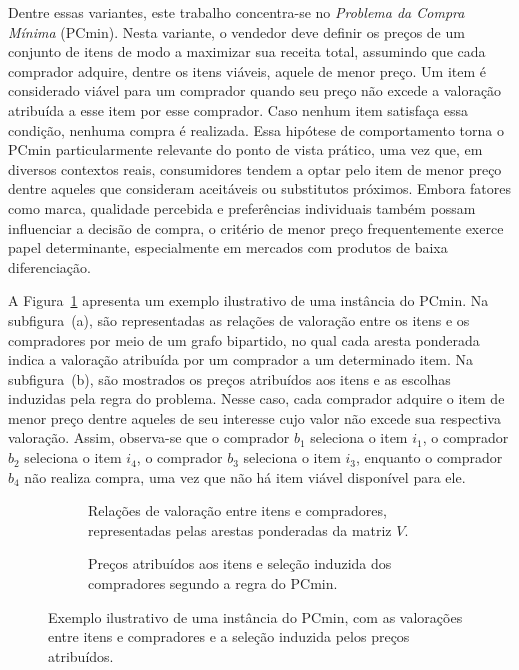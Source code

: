 Dentre essas variantes, este trabalho concentra-se no \textit{Problema da Compra Mínima} (PCmin). Nesta variante, o vendedor deve definir os preços de um conjunto de itens de modo a maximizar sua receita total, assumindo que cada comprador adquire, dentre os itens viáveis, aquele de menor preço. Um item é considerado viável para um comprador quando seu preço não excede a valoração atribuída a esse item por esse comprador. Caso nenhum item satisfaça essa condição, nenhuma compra é realizada. Essa hipótese de comportamento torna o PCmin particularmente relevante do ponto de vista prático, uma vez que, em diversos contextos reais, consumidores tendem a optar pelo item de menor preço dentre aqueles que consideram aceitáveis ou substitutos próximos. Embora fatores como marca, qualidade percebida e preferências individuais também possam influenciar a decisão de compra, o critério de menor preço frequentemente exerce papel determinante, especialmente em mercados com produtos de baixa diferenciação.

A Figura~\ref{fig:exemploPCmin} apresenta um exemplo ilustrativo de uma instância do PCmin. Na subfigura~(a), são representadas as relações de valoração entre os itens e os compradores por meio de um grafo bipartido, no qual cada aresta ponderada indica a valoração atribuída por um comprador a um determinado item. Na subfigura~(b), são mostrados os preços atribuídos aos itens e as escolhas induzidas pela regra do problema. Nesse caso, cada comprador adquire o item de menor preço dentre aqueles de seu interesse cujo valor não excede sua respectiva valoração. Assim, observa-se que o comprador $b_1$ seleciona o item $i_1$, o comprador $b_2$ seleciona o item $i_4$, o comprador $b_3$ seleciona o item $i_3$, enquanto o comprador $b_4$ não realiza compra, uma vez que não há item viável disponível para ele.

\begin{figure}[H]
\centering

\begin{subfigure}[t]{0.45\textwidth}
    \centering
    \conjuntoItensValorados
    \caption{Relações de valoração entre itens e compradores, representadas pelas arestas ponderadas da matriz $V$.}
\end{subfigure}
\hfill
\begin{subfigure}[t]{0.45\textwidth}
    \centering
    \conjuntoItensPrecificados
    \caption{Preços atribuídos aos itens e seleção induzida dos compradores segundo a regra do PCmin.}
\end{subfigure}

\caption{Exemplo ilustrativo de uma instância do PCmin, com as valorações entre itens e compradores e a seleção induzida pelos preços atribuídos.}
\label{fig:exemploPCmin}
\end{figure}

